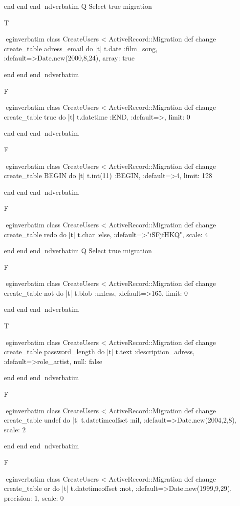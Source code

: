     end 
  end 
end
nd{verbatim}
Q
 Select true migration

T

egin{verbatim}
 class CreateUsers < ActiveRecord::Migration 
  def change 
    create_table adress_email do |t| 
      t.date :film_song, :default=>Date.new(2000,8,24), array: true
    
    end 
  end 
end
nd{verbatim}

F

egin{verbatim}
 class CreateUsers < ActiveRecord::Migration 
  def change 
    create_table true do |t| 
      t.datetime :END, :default=>, limit: 0
    
    end 
  end 
end
nd{verbatim}

F

egin{verbatim}
 class CreateUsers < ActiveRecord::Migration 
  def change 
    create_table BEGIN do |t| 
      t.int(11) :BEGIN, :default=>4, limit: 128
    
    end 
  end 
end
nd{verbatim}

F

egin{verbatim}
 class CreateUsers < ActiveRecord::Migration 
  def change 
    create_table redo do |t| 
      t.char :else, :default=>"iSFjfHKQ", scale: 4
    
    end 
  end 
end
nd{verbatim}
Q
 Select true migration

F

egin{verbatim}
 class CreateUsers < ActiveRecord::Migration 
  def change 
    create_table not do |t| 
      t.blob :unless, :default=>165, limit: 0
    
    end 
  end 
end
nd{verbatim}

T

egin{verbatim}
 class CreateUsers < ActiveRecord::Migration 
  def change 
    create_table password_length do |t| 
      t.text :description_adress, :default=>role_artist, null: false
    
    end 
  end 
end
nd{verbatim}

F

egin{verbatim}
 class CreateUsers < ActiveRecord::Migration 
  def change 
    create_table undef do |t| 
      t.datetimeoffset :nil, :default=>Date.new(2004,2,8), scale: 2
    
    end 
  end 
end
nd{verbatim}

F

egin{verbatim}
 class CreateUsers < ActiveRecord::Migration 
  def change 
    create_table or do |t| 
      t.datetimeoffset :not, :default=>Date.new(1999,9,29), precision: 1, scale: 0
    

